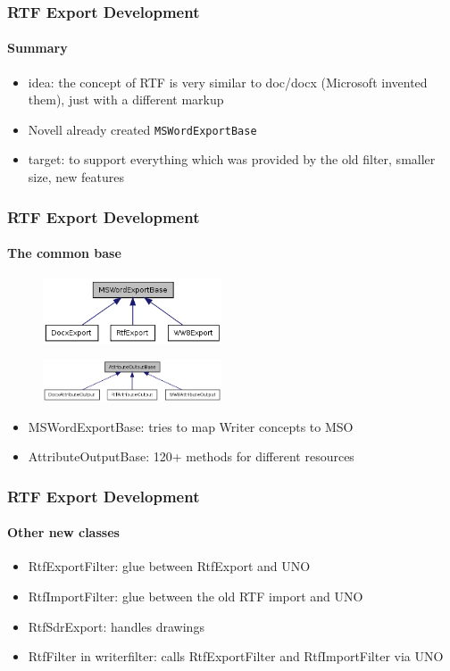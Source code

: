 \documentclass[hyperref={pdfpagelabels=false}]{beamer}
\begin{document}
\begin{frame}
\frametitle{RTF Export Development}
\framesubtitle{Summary}
\begin{itemize}
\item idea: the concept of RTF is very similar to doc/docx (Microsoft invented
them), just with a different markup
\item Novell already created \texttt{MSWordExportBase}
\item target: to support everything which was provided by the old filter,
smaller size, new features
\end{itemize}
\end{frame}

\begin{frame}
\frametitle{RTF Export Development}
\framesubtitle{The common base}
\begin{figure}[H]
\includegraphics[width=200px,keepaspectratio]{pic/uml.png}
\end{figure}
\begin{figure}[H]
\includegraphics[width=200px,keepaspectratio]{pic/uml-iface.png}
\end{figure}
\begin{itemize}
\item MSWordExportBase: tries to map Writer concepts to MSO
\item AttributeOutputBase: 120+ methods for different resources
\end{itemize}
\end{frame}

\begin{frame}
\frametitle{RTF Export Development}
\framesubtitle{Other new classes}
\begin{itemize}
\item RtfExportFilter: glue between RtfExport and UNO
\item RtfImportFilter: glue between the old RTF import and UNO
\item RtfSdrExport: handles drawings
\item RtfFilter in writerfilter: calls RtfExportFilter and RtfImportFilter via
UNO
\end{itemize}
\end{frame}
\end{document}
